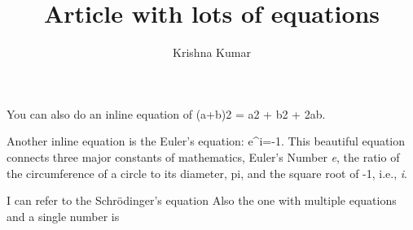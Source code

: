 \documentclass[times]{article}
\title{Article with lots of equations}
\author{Krishna Kumar}
\date{}
\begin{document}
\maketitle

You can also do an inline equation of (a+b)2 = a2 + b2 + 2ab.

Another inline equation is the Euler's equation: e^{i\pi}=-1. This beautiful equation connects three major constants of mathematics, Euler's Number \textit{e}, the ratio of the circumference of a circle to its diameter, pi, and the square root of -1, i.e., \textit{i}.

I can refer to the Schr\"{o}dinger's equation %
Also the one with multiple equations and a single number is %



%
%
%
%
%
\end{document}
